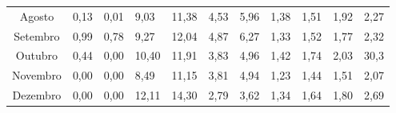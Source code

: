 \documentclass[a4paper]{article}
\begin{document}
\begin{table}[H]
{\begin{tabular}{ccllllllllr}
Agosto & 0,13 & 0,01 & 9,03 & 11,38 & 4,53 & 5,96 & 1,38 & 1,51 & 1,92 & 2,27 \\
Setembro & 0,99 & 0,78 & 9,27 & 12,04 & 4,87 & 6,27 & 1,33 & 1,52 & 1,77 & 2,32 \\
Outubro & 0,44 & 0,00 & 10,40 & 11,91 & 3,83 & 4,96 & 1,42 & 1,74 & 2,03 & 30,3 \\
\multicolumn{1}{l}{Novembro} & \multicolumn{1}{l}{0,00} & 0,00 & 8,49 & 11,15 & 3,81 & 4,94 & 1,23 & 1,44 & 1,51 & \multicolumn{1}{l}{2,07} \\
Dezembro & \multicolumn{1}{l}{0,00} & 0,00 & 12,11 & 14,30 & 2,79 & 3,62 & 1,34 & 1,64 & 1,80 & \multicolumn{1}{l}{2,69} \\ \hline
\end{tabular}%
}
\end{table}

\newpage 

\begin{table}[H]
\centering
\caption{Sample Entropy (\textit{m} = 1, . . . , 6; \textit{r} = 0, 20) da velocidade do vento em Petrolina de maio a agosto de 2010, nas alturas 25m e 50m.}
\end{table}
\end{document}
